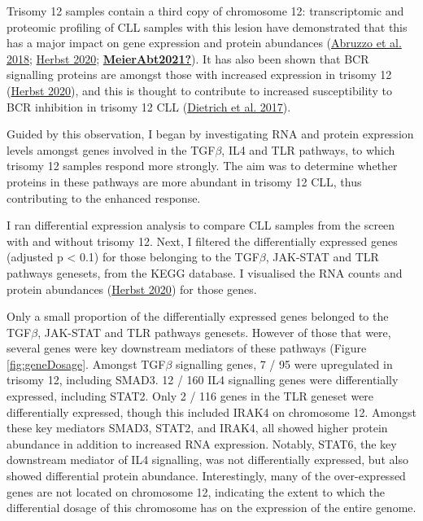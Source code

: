 \documentclass[11pt, a4paper, twosided]{book}
\begin{document}
Trisomy 12 samples contain a third copy of chromosome 12: transcriptomic and proteomic profiling of CLL samples with this lesion have demonstrated that this has a major impact on gene expression and protein abundances (\protect\hyperlink{ref-Abruzzo2018}{Abruzzo et al. 2018}; \protect\hyperlink{ref-HerbstThesis}{Herbst 2020}; \protect\hyperlink{ref-MeierAbt2021}{\textbf{MeierAbt2021?}}). It has also been shown that BCR signalling proteins are amongst those with increased expression in trisomy 12 (\protect\hyperlink{ref-HerbstThesis}{Herbst 2020}), and this is thought to contribute to increased susceptibility to BCR inhibition in trisomy 12 CLL (\protect\hyperlink{ref-JCIpaper}{Dietrich et al. 2017}).

Guided by this observation, I began by investigating RNA and protein expression levels amongst genes involved in the TGF\(\beta\), IL4 and TLR pathways, to which trisomy 12 samples respond more strongly. The aim was to determine whether proteins in these pathways are more abundant in trisomy 12 CLL, thus contributing to the enhanced response.

I ran differential expression analysis to compare CLL samples from the screen with and without trisomy 12. Next, I filtered the differentially expressed genes (adjusted p \textless{} 0.1) for those belonging to the TGF\(\beta\), JAK-STAT and TLR pathways genesets, from the KEGG database. I visualised the RNA counts and protein abundances (\protect\hyperlink{ref-HerbstThesis}{Herbst 2020}) for those genes.

Only a small proportion of the differentially expressed genes belonged to the TGF\(\beta\), JAK-STAT and TLR pathways genesets. However of those that were, several genes were key downstream mediators of these pathways (Figure \ref{fig:geneDosage}. Amongst TGF\(\beta\) signalling genes, 7 / 95 were upregulated in trisomy 12, including SMAD3. 12 / 160 IL4 signalling genes were differentially expressed, including STAT2. Only 2 / 116 genes in the TLR geneset were differentially expressed, though this included IRAK4 on chromosome 12. Amongst these key mediators SMAD3, STAT2, and IRAK4, all showed higher protein abundance in addition to increased RNA expression. Notably, STAT6, the key downstream mediator of IL4 signalling, was not differentially expressed, but also showed differential protein abundance. Interestingly, many of the over-expressed genes are not located on chromosome 12, indicating the extent to which the differential dosage of this chromosome has on the expression of the entire genome.
\end{document}
